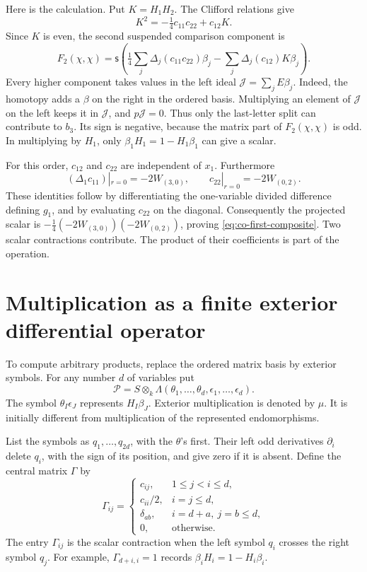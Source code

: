 Here is the calculation. Put \(K=H_1H_2\). The Clifford relations give
\[
 K^2=-\tfrac14c_{11}c_{22}+c_{12}K.
\]
Since \(K\) is even, the second suspended comparison component is
\[
 F_2(\chi,\chi)=\mathsf{s}\left(
 \tfrac14\sum_j\Delta_j(c_{11}c_{22})\beta_j
 -\sum_j\Delta_j(c_{12})K\beta_j\right).
\]
Every higher component takes values in the left ideal
\(\mathcal J=\sum_jE\beta_j\). Indeed, the homotopy adds a
\(\beta\) on the right in the ordered basis.
Multiplying an element of \(\mathcal J\) on the left keeps it
in \(\mathcal J\), and \(p\mathcal J=0\).
Thus only the last-letter split can contribute to \(b_3\).
Its sign is negative, because the matrix part of \(F_2(\chi,\chi)\)
is odd. In multiplying by \(H_1\), only
\(\beta_1H_1=1-H_1\beta_1\) can give a scalar.

For this order, \(c_{12}\) and \(c_{22}\) are independent of \(x_1\).
Furthermore
\[
 (\Delta_1c_{11})|_{r=0}=-2W_{(3,0)},\qquad
 c_{22}|_{r=0}=-2W_{(0,2)}.
\]
These identities follow by differentiating the one-variable divided
difference defining \(g_1\), and by evaluating \(c_{22}\) on the
diagonal. Consequently the projected scalar is
\(-\tfrac14(-2W_{(3,0)})(-2W_{(0,2)})\), proving
\eqref{eq:co-first-composite}. Two scalar contractions contribute.
The product of their coefficients is part of the operation.

\section{Multiplication as a finite exterior differential operator}
\label{sec:co-symbol-product}

To compute arbitrary products, replace the ordered matrix basis by
exterior symbols. For any number \(d\) of variables put
\[
 \mathcal P=S\otimes_k\Lambda(\theta_1,\ldots,\theta_d,
                                      \epsilon_1,\ldots,\epsilon_d).
\]
The symbol \(\theta_I\epsilon_J\) represents \(H_I\beta_J\).
Exterior multiplication is denoted by \(\mu\). It is initially
different from multiplication of the represented endomorphisms.

List the symbols as \(q_1,\ldots,q_{2d}\), with the \(\theta\)'s first.
Their left odd derivatives \(\partial_i\) delete \(q_i\), with the
sign of its position, and give zero if it is absent. Define the
central matrix \(\Gamma\) by
\[
 \Gamma_{ij}=
 \begin{cases}
 c_{ij},&1\le j<i\le d,\\
 c_{ii}/2,&i=j\le d,\\
 \delta_{ab},&i=d+a,\ j=b\le d,\\
 0,&\text{otherwise}.
 \end{cases}
\]
The entry \(\Gamma_{ij}\) is the scalar contraction when the left
symbol \(q_i\) crosses the right symbol \(q_j\).
For example, \(\Gamma_{d+i,i}=1\) records
\(\beta_iH_i=1-H_i\beta_i\).

